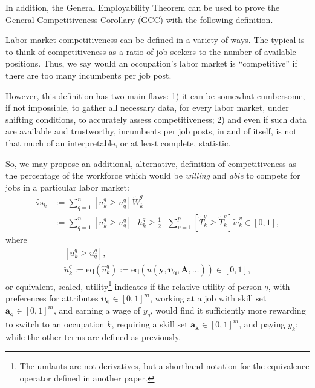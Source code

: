 \documentclass[hidelinks, nonatbib]{elsarticle}
\begin{document}
In addition, the General Employability Theorem can be used to prove the General Competitiveness Corollary (GCC) with the following definition.
\begin{definition}[Competitiveness]
    \label{def_competitiveness}
    Labor market competitiveness can be defined in a variety of ways. The typical is to think of competitiveness as a ratio of job seekers to the number of available positions. Thus, we say would an occupation's labor market is ``competitive'' if there are too many incumbents per job post.
    
    However, this definition has two main flaws: 1) it can be somewhat cumbersome, if not impossible, to gather all necessary data, for every labor market, under shifting conditions, to accurately assess competitiveness; 2) and even if such data are available and trustworthy, incumbents per job posts, in and of itself, is not that much of an interpretable, or at least complete, statistic.
    
    So, we may propose an additional, alternative, definition of competitiveness as the percentage of the workforce which would be \textit{willing} and \textit{able} to compete for jobs in a particular labor market:
    \begin{align}
        \tilde{\text{vs}}_{k}
        &:=
        \sum_{q=1}^{n}
        \left[
            \ddot{u}_{k}^{q}
            \geq
            \ddot{u}_{q}^{q}
        \right]
        \tilde{W}_{k}^{q}
        \\
        &:=
        \sum_{q=1}^{n}
        \left[
            \ddot{u}_{k}^{q}
            \geq
            \ddot{u}_{q}^{q}
        \right]
        \left[
            h_{k}^{q}
            \geq
            \frac{1}{2}
        \right]
        \sum_{v=1}^{p}
        \left[
            \tilde{T}_{k}^{q}
            \geq
            \tilde{T}_{k}^{v}
        \right]
        \tilde{w}_{k}^{v}
        \in
        [0,1]
        ,
        \end{align}
    where
    \begin{gather}
        \left[
            \ddot{u}_{k}^{q}
            \geq
            \ddot{u}_{q}^{q}
        \right]
        ,
        \\
        \ddot{u}_{k}^{q} 
        :=
        \text{eq}(
            \hat{u}_{k}^{q}
        )
        :=
        \text{eq}\left(
            u(
            \boldsymbol{y},
            \boldsymbol{\upsilon_q},
            \textbf{A},
            \dots
        )
        \right)
        \in
        [0,1]
        ,
    \end{gather}
    or equivalent, scaled, utility\footnote{The umlauts are not derivatives, but a shorthand notation for the equivalence operator defined in another paper.} indicates if the relative utility of person $q$, with preferences for attributes $\boldsymbol{\upsilon_q} \in [0,1] ^ m$, working at a job with skill set $\boldsymbol{a_q} \in [0,1] ^ m$, and earning a wage of $y_q$, would find it sufficiently more rewarding to switch to an occupation $k$, requiring a skill set $\boldsymbol{a_k} \in [0,1] ^ m$, and paying $y_k$; while the other terms are defined as previously.
    

\end{definition}
\end{document}
